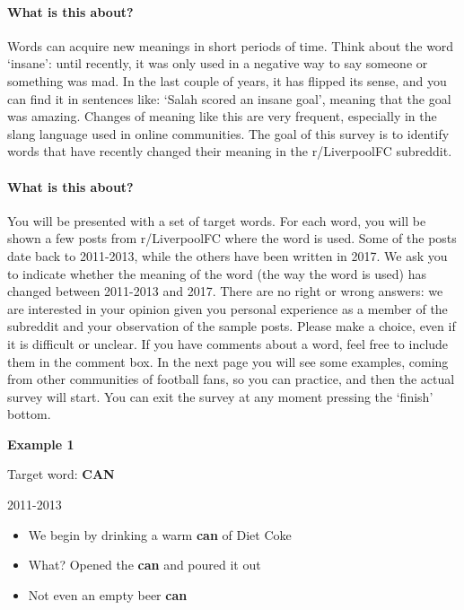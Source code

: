 \documentclass[11pt,a4paper]{article}
\begin{document}
\pagebreak

\clearpage


\begin{minipage}{15cm}

\paragraph{What is this about?}
Words can acquire new meanings in short periods of time. Think about the word `insane': until recently, it was only used in a negative way to say someone or something was mad. In the last couple of years, it has flipped its sense, and you can find it in sentences like: `Salah scored an insane goal', meaning that the goal was amazing.
Changes of meaning like this are very frequent, especially in the slang language used in online communities. The goal of this survey is to identify words that have recently changed their meaning in the r/LiverpoolFC subreddit.
\\
\paragraph{What is this about?}
You will be presented with a set of target words. For each word, you will be shown a few posts from r/LiverpoolFC where the word is used. Some of the posts date back to 2011-2013, while the others have been written in 2017.
We ask you to indicate whether the meaning of the word (the way the word is used) has changed between 2011-2013 and 2017. There are no right or wrong answers: we are interested in your opinion given you personal experience as a member of the subreddit and your observation of the sample posts. Please make a choice, even if it is difficult or unclear. If you have comments about a word, feel free to include them in the comment box. In the next page you will see some examples, coming from other communities of football fans, so you can practice, and then the actual survey will start. You can exit the survey at any moment pressing the `finish' bottom. 

\vspace*{0.5cm}

\textbf{Example 1}

\vspace*{0.5cm}

Target word: \textbf{CAN}

\vspace*{0.25cm}
2011-2013
\begin{itemize}
\item We begin by drinking a warm \textbf{can} of Diet Coke
\item What? Opened the \textbf{can} and poured it out
\item Not even an empty beer \textbf{can}
\end{itemize}


\end{minipage}
\end{document}
